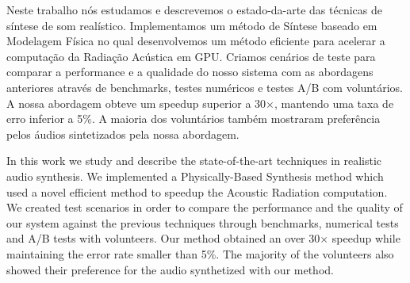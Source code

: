 \resumo
Neste trabalho nós estudamos e descrevemos o estado-da-arte das técnicas de síntese de som realístico. Implementamos um método de Síntese baseado em Modelagem Física no qual desenvolvemos um método eficiente para acelerar a computação da Radiação Acústica em GPU. Criamos cenários de teste para comparar a performance e a qualidade do nosso sistema com as abordagens anteriores através de benchmarks, testes numéricos e testes A/B com voluntários. A nossa abordagem obteve um speedup superior a 30$\times$, mantendo uma taxa de erro inferior a 5\%. A maioria dos voluntários também mostraram preferência pelos áudios sintetizados pela nossa abordagem.

\abstract
In this work we study and describe the state-of-the-art techniques in realistic audio synthesis. We implemented a Physically-Based Synthesis method which used a novel efficient method to speedup the Acoustic Radiation computation. We created test scenarios in order to compare the performance and the quality of our system against the previous techniques through benchmarks, numerical tests and A/B tests with volunteers. Our method obtained an over 30$\times$ speedup while maintaining the error rate smaller than 5\%. The majority of the volunteers also showed their preference for the audio synthetized with our method.   
